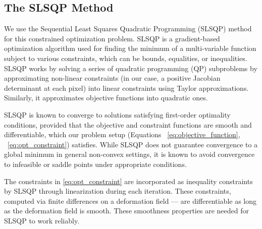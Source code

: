 \subsection{The SLSQP Method}
\label{sec:slsqp_method}

We use the Sequential Least Squares Quadratic Programming (SLSQP) method \cite{Kraft_1988, SciPySLSQPDoc} for this constrained optimization problem. SLSQP is a gradient-based optimization algorithm used for finding the minimum of a multi-variable function subject to various constraints, which can be bounds, equalities, or inequalities. SLSQP works by solving a series of quadratic programming (QP) subproblems by approximating non-linear constraints (in our case, a positive Jacobian determinant at each pixel) into linear constraints using Taylor approximations. Similarly, it approximates objective functions into quadratic ones. 

SLSQP is known to converge to solutions satisfying first-order optimality conditions, provided that the objective and constraint functions are smooth and differentiable, which our problem setup (Equations ~\ref{eq:objective_function},  ~\ref{eq:opt_constraint}) satisfies. While SLSQP does not guarantee convergence to a global minimum in general non-convex settings, it is known to avoid convergence to infeasible or saddle points under appropriate conditions.

The constraints in \autoref{eq:opt_constraint} are incorporated as inequality constraints by SLSQP through linearization during each iteration. These constraints, computed via finite differences on a deformation field — are differentiable as long as the deformation field is smooth. These smoothness properties are needed for SLSQP to work reliably. 



